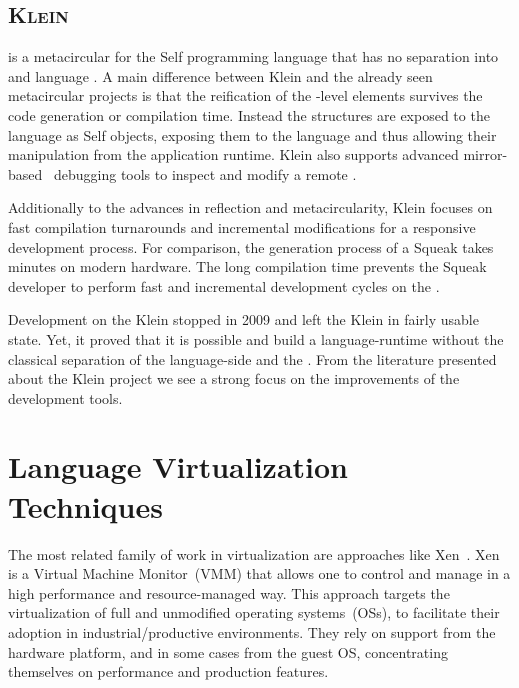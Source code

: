\subsection*{\textsc{Klein \VM}}

 is a metacircular \VM for the Self programming language that has no separation into \VM and language \cite{Unga05a}.
A main difference between Klein and the already seen metacircular \VM projects is that the reification of the \VM-level elements survives the code generation or compilation time.
Instead the \VM structures are exposed to the language as Self objects, exposing them to the language and thus allowing their manipulation from the application runtime.
Klein also supports advanced mirror-based~\cite{Brac04b} debugging tools to inspect and modify a remote \VM.

Additionally to the advances in reflection and metacircularity, Klein focuses on fast compilation turnarounds and incremental modifications for a responsive development process.
For comparison, the generation process of a Squeak \VM takes minutes on modern hardware. The long compilation time prevents the Squeak \VM developer to perform fast and incremental development cycles on the \VM.

Development on the Klein \VM stopped in 2009 and left the Klein \VM in fairly usable state.
Yet, it proved that it is possible and build a language-runtime without the classical separation of the language-side and the \VM.
From the literature presented about the Klein project we see a strong focus on the improvements of the development tools.

\section{Language Virtualization Techniques}\label{sec:background_virtualization_techniques}

The most related family of work in virtualization are approaches like Xen~\cite{Chis07a}. Xen is a Virtual Machine Monitor~(VMM) that allows one to control and manage \VMs in a high performance and resource-managed way. This approach targets the virtualization of full and unmodified operating systems~(OSs), to facilitate their adoption in industrial/productive environments. They rely on support from the hardware platform, and in some cases from the guest OS, concentrating themselves on performance and production features.

